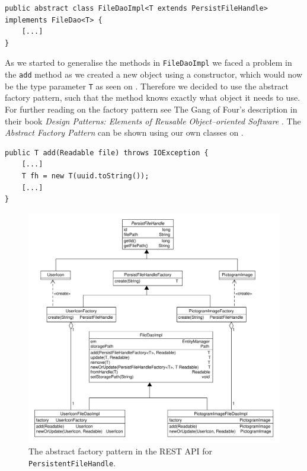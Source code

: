 \begin{lstlisting}[float, floatplacement=h, caption={The \texttt{FileDaoImpl} class header which uses Type Parameters to generalise which types it can be used with.},label={lst:typeparameter}]
public abstract class FileDaoImpl<T extends PersistFileHandle> implements FileDao<T> {
    [...]
}
\end{lstlisting}

As we started to generalise the methods in \texttt{FileDaoImpl} we faced a problem in the \texttt{add} method as we created a new object using a constructor, which would now be the type parameter \texttt{T} as seen on .
Therefore we decided to use the abstract factory pattern, such that the method knows exactly what object it needs to use.
For further reading on the factory pattern see The Gang of Four's description in their book \textit{Design Patterns: Elements of Reusable Object--oriented Software} \cite{abstractfactorypattern}.
The \textit{Abstract Factory Pattern} can be shown using our own classes on .

\begin{lstlisting}[float, floatplacement=h, caption={Trying to use a Type Parameter constructor, which Java cannot do.},label={lst:TypeParameterConstructor}]
public T add(Readable file) throws IOException {
    [...]
    T fh = new T(uuid.toString());
    [...]
}
\end{lstlisting}

\begin{figure}[h]
    \centering
    \includegraphics[width=\textwidth]{figures/factorymodel.pdf}
    \caption{The abstract factory pattern in the REST API for \texttt{PersistentFileHandle}.}\label{fig:asbtractFactory}
\end{figure}

